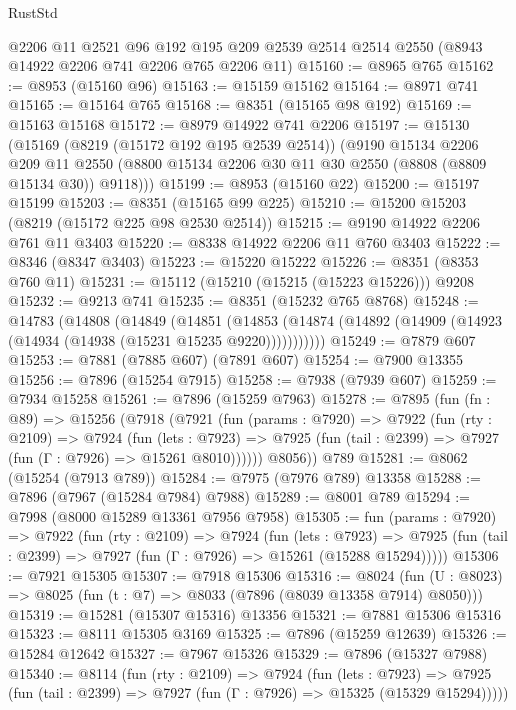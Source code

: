 \begin{lexlean}{RustStd}
\begin{coremodule}
{\begin{coremodule}
{{{{{{{{{{{{{{{{{{{{{{{{{{{{{{{{{{{{{{{{{{{{{{{{{{    @2206
    @11
    @2521
    @96
    @192
    @195
    @209
    @2539
    @2514
    @2514
    @2550
    (@8943 @14922 @2206 @741 @2206 @765 @2206 @11)
@15160 := @8965 @765
@15162 := @8953 (@15160 @96)
@15163 := @15159 @15162
@15164 := @8971 @741
@15165 := @15164 @765
@15168 := @8351 (@15165 @98 @192)
@15169 := @15163 @15168
@15172 := @8979 @14922 @741 @2206
@15197 := @15130
    (@15169
      (@8219 (@15172 @192 @195 @2539 @2514))
      (@9190
        @15134
        @2206
        @209
        @11
        @2550
        (@8800 @15134 @2206 @30 @11 @30 @2550 (@8808 (@8809 @15134 @30)) @9118)))
@15199 := @8953 (@15160 @22)
@15200 := @15197 @15199
@15203 := @8351 (@15165 @99 @225)
@15210 := @15200 @15203 (@8219 (@15172 @225 @98 @2530 @2514))
@15215 := @9190 @14922 @2206 @761 @11 @3403
@15220 := @8338 @14922 @2206 @11 @760 @3403
@15222 := @8346 (@8347 @3403)
@15223 := @15220 @15222
@15226 := @8351 (@8353 @760 @11)
@15231 := @15112 (@15210 (@15215 (@15223 @15226))) @9208
@15232 := @9213 @741
@15235 := @8351 (@15232 @765 @8768)
@15248 := @14783
    (@14808
      (@14849
        (@14851
          (@14853 (@14874 (@14892 (@14909 (@14923 (@14934 (@14938 (@15231 @15235 @9220)))))))))))
@15249 := @7879 @607
@15253 := @7881 (@7885 @607) (@7891 @607)
@15254 := @7900 @13355
@15256 := @7896 (@15254 @7915)
@15258 := @7938 (@7939 @607)
@15259 := @7934 @15258
@15261 := @7896 (@15259 @7963)
@15278 := @7895
    (fun (fn : @89) =>
    @15256
      (@7918
        (@7921
          (fun (params : @7920) =>
          @7922
            (fun (rty : @2109) =>
            @7924
              (fun (lets : @7923) =>
              @7925 (fun (tail : @2399) => @7927 (fun (Γ : @7926) => @15261 @8010))))))
        @8056))
    @789
@15281 := @8062 (@15254 (@7913 @789))
@15284 := @7975 (@7976 @789) @13358
@15288 := @7896 (@7967 (@15284 @7984) @7988)
@15289 := @8001 @789
@15294 := @7998 (@8000 @15289 @13361 @7956 @7958)
@15305 := fun (params : @7920) =>
  @7922
    (fun (rty : @2109) =>
    @7924
      (fun (lets : @7923) =>
      @7925 (fun (tail : @2399) => @7927 (fun (Γ : @7926) => @15261 (@15288 @15294)))))
@15306 := @7921 @15305
@15307 := @7918 @15306
@15316 := @8024
    (fun (U : @8023) => @8025 (fun (t : @7) => @8033 (@7896 (@8039 @13358 @7914) @8050)))
@15319 := @15281 (@15307 @15316) @13356
@15321 := @7881 @15306 @15316
@15323 := @8111 @15305 @3169
@15325 := @7896 (@15259 @12639)
@15326 := @15284 @12642
@15327 := @7967 @15326
@15329 := @7896 (@15327 @7988)
@15340 := @8114
    (fun (rty : @2109) =>
    @7924
      (fun (lets : @7923) =>
      @7925 (fun (tail : @2399) => @7927 (fun (Γ : @7926) => @15325 (@15329 @15294)))))
}}}}}}}}}}}}}}}}}}}}}}}}}}}}}}}}}}}}}}}}}}}}}}}}}}
\end{coremodule}}
\end{coremodule}
\end{lexlean}

